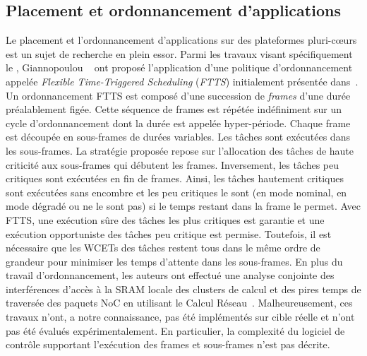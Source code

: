 \documentclass[main.tex]{subfiles}
\begin{document}
\subsection{Placement et ordonnancement d'applications}
Le placement et l'ordonnancement d'applications sur des plateformes pluri-c\oe{}urs est un sujet de recherche en plein essor. Parmi les travaux visant spécifiquement le \mppalong, Giannopoulou \etal~\cite{Giannopoulou2015} ont proposé l'application d'une politique d'ordonnancement appelée \emph{Flexible Time-Triggered Scheduling} (\emph{FTTS}) initialement présentée dans~\cite{Giannopoulou2013_EMSOFT}. Un ordonnancement FTTS est composé d'une succession de \emph{frames} d'une durée préalablement figée. Cette séquence de frames est répétée indéfiniment sur un cycle d'ordonnancement dont la durée est appelée hyper-période. Chaque frame est découpée en sous-frames de durées variables. Les tâches sont exécutées dans les sous-frames. La stratégie proposée repose sur l'allocation des tâches de haute criticité aux sous-frames qui débutent les frames. Inversement, les tâches peu critiques sont exécutées en fin de frames. Ainsi, les tâches hautement critiques sont exécutées sans encombre et les peu critiques le sont (en mode nominal, en mode dégradé ou ne le sont pas) si le temps restant dans la frame le permet. Avec FTTS, une exécution sûre des tâches les plus critiques est garantie et une exécution opportuniste des tâches peu critique est permise. Toutefois, il est nécessaire que les WCETs des tâches restent tous dans le même ordre de grandeur pour minimiser les temps d'attente dans les sous-frames. En plus du travail d'ordonnancement, les auteurs ont effectué une analyse conjointe des interférences d'accès à la SRAM locale des clusters de calcul et des pires temps de traversée des paquets NoC en utilisant le Calcul Réseau~\cite{LeBoudec2001, Cruz91}. Malheureusement, ces travaux n'ont, a notre connaissance, pas été implémentés sur cible réelle et n'ont pas été évalués expérimentalement. En particulier, la complexité du logiciel de contrôle supportant l'exécution des frames et sous-frames n'est pas décrite.
\end{document}
